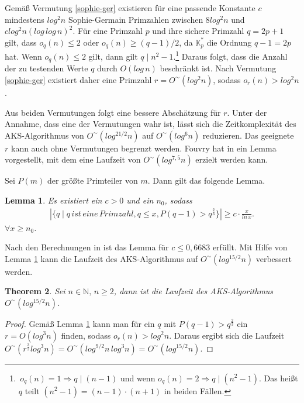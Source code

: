\documentclass[12pt,oneside]{article}
\newtheorem{theorem}{Theorem}[section]
\newtheorem{lemma}[theorem]{Lemma}
\theoremstyle{remark}
\theoremstyle{definition}
\begin{document}
Gemäß Vermutung \ref{sophie-ger} existieren für eine passende Konstante $c$ mindestens $log^2n$ Sophie-Germain Primzahlen zwischen $8 log^2 n$ und $c log^2n(log \, log \, n)^2$. Für eine Primzahl $p$ und ihre sichere Primzahl $q = 2p + 1$ gilt, dass $o_{q}(n) \leq  2$ oder $o_{q}(n) \geq (q - 1)/2$, da $\mathbb{K}_{p}^{*}$ die Ordnung $q - 1 = 2p$ hat. Wenn $o_{q}(n) \leq 2$ gilt, dann gilt $q \mid n^2 - 1$.\footnote{$ \, o_{q}(n) = 1 \Rightarrow q \mid (n - 1)$ und wenn $o_{q}(n) = 2 \Rightarrow q \mid (n^2 - 1)$. Das heißt $q$ teilt $(n^2 - 1) = (n - 1) \cdot (n + 1)$ in beiden Fällen.} Daraus folgt, dass die Anzahl der zu testenden Werte $q$ durch $O(log \, n)$ beschränkt ist. Nach Vermutung \ref{sophie-ger} existiert daher eine Primzahl $r = O^{\sim}(log^2 n)$, sodass $o_{r}(n) > log^2n$. 

Aus beiden Vermutungen folgt eine bessere Abschätzung für $r$. Unter der Annahme, dass eine der Vermutungen wahr ist, lässt sich die Zeitkomplexität des AKS-Algorithmus von $O^{\sim}(log^{21/2}n)$ auf $O^{\sim}(log^6n)$ reduzieren. Das geeignete $r$ kann auch ohne Vermutungen begrenzt werden. Fouvry hat in \cite{fouvry} ein Lemma vorgestellt, mit dem eine Laufzeit von $O^{\sim}(log^{7,5}n)$ erzielt werden kann. 

Sei $P(m)$ der größte Primteiler von $m$. Dann gilt das folgende Lemma. 
\begin{lemma}\label{fovury-lemma}
Es existiert ein $c > 0$ und ein $n_0$, sodass
\begin{align*}
     |\{ q \mid q \, ist \,  eine \, Primzahl, q \leq x, P(q - 1) > q^{\frac{2}{3}}\}| \geq c \cdot \frac{x}{ln \, x}.
\end{align*}
$\forall x \geq n_0$.
\end{lemma}

Nach den Berechnungen in \cite{baker-hartman} ist das Lemma für $c \leq 0,6683$ erfüllt. Mit Hilfe von Lemma \ref{fovury-lemma} kann die Laufzeit des AKS-Algorithmus auf $O^{\sim}(log^{15/2}n)$ verbessert werden.

\begin{theorem}
Sei $n \in \mathbb{N}, \, n \geq 2$, dann ist die Laufzeit des AKS-Algorithmus $O^{\sim}(log^{15/2}n)$.
\end{theorem}

\begin{proof}
Gemäß Lemma \ref{fovury-lemma} kann man für ein $q$ mit $P(q - 1) > q^{ \frac{2}{3}}$ ein $r = O(log^3 n)$ finden, sodass $o_{r}(n) > log^2 n$. Daraus ergibt sich die Laufzeit $O^{\sim}(r^{\frac{3}{2}} log^3 n) = O^{\sim}(log^{9/2}n \, log^3 n) = O^{\sim}(log^{15/2} n)$.
\end{proof}
\end{document}
